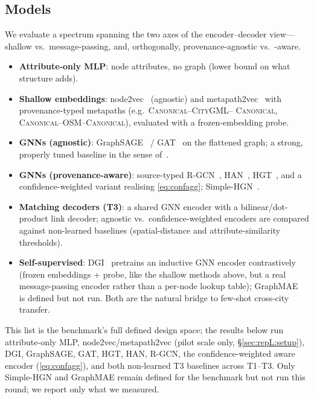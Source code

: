 \subsection{Models}
\label{sec:repL:models}
We evaluate a spectrum spanning the two axes of the encoder--decoder
view---shallow vs.\ message-passing, and, orthogonally, provenance-agnostic vs.\
-aware.
\begin{itemize}
  \item \textbf{Attribute-only MLP}: node attributes, no graph (lower bound on
  what structure adds).
  \item \textbf{Shallow embeddings}: node2vec~\cite{grover2016node2vec}
  (agnostic) and metapath2vec~\cite{dong2017metapath2vec} with
  provenance-typed metapaths (e.g.\ \textsc{Canonical}--\textsc{CityGML}--
  \textsc{Canonical}, \textsc{Canonical}--\textsc{OSM}--\textsc{Canonical}),
  evaluated with a frozen-embedding probe.
  \item \textbf{GNNs (agnostic)}: GraphSAGE~\cite{hamilton2017graphsage} /
  GAT~\cite{velickovic2018gat} on the flattened graph; a strong, properly tuned
  baseline in the sense of~\citet{lv2021hgb}.
  \item \textbf{GNNs (provenance-aware)}: source-typed
  R-GCN~\cite{schlichtkrull2018rgcn}, HAN~\cite{wang2019han},
  HGT~\cite{hu2020hgt}, and a confidence-weighted variant realising
  \cref{eq:confagg}; Simple-HGN~\cite{lv2021hgb}.
  \item \textbf{Matching decoders (T3)}: a shared GNN encoder with a
  bilinear/dot-product link decoder; agnostic vs.\ confidence-weighted encoders
  are compared against non-learned baselines (spatial-distance and
  attribute-similarity thresholds).
  \item \textbf{Self-supervised}: DGI~\cite{velickovic2019dgi} pretrains an
  inductive GNN encoder contrastively (frozen embeddings + probe, like the
  shallow methods above, but a real message-passing encoder rather than a
  per-node lookup table); GraphMAE~\cite{hou2022graphmae} is defined but not
  run. Both are the natural bridge to few-shot cross-city transfer.
\end{itemize}
This list is the benchmark's full defined design space; the results below run
attribute-only MLP, node2vec/metapath2vec (pilot scale only,
\S\ref{sec:repL:setup}), DGI, GraphSAGE, GAT, HGT, HAN, R-GCN, the
confidence-weighted aware encoder (\cref{eq:confagg}), and both non-learned T3
baselines across T1--T3. Only Simple-HGN and GraphMAE remain defined for the
benchmark but not run this round; we report only what we measured.

